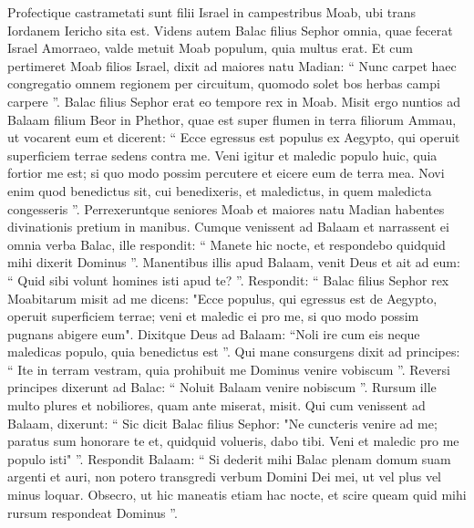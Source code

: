 \begin{biblechapter}
\begin{biblechapter}
\begin{biblechapter}
\begin{biblechapter}
\begin{biblechapter}
\begin{biblechapter}
\begin{biblechapter}
\begin{biblechapter}
\begin{biblechapter}
\begin{biblechapter}
\begin{biblechapter}
\begin{biblechapter}
\begin{biblechapter}
\begin{biblechapter}
\begin{biblechapter}
\begin{biblechapter}
\begin{biblechapter}
\begin{biblechapter}
\begin{biblechapter}
\begin{biblechapter}
\begin{biblechapter}
\begin{biblechapter}
\verse Profectique castrametati sunt filii Israel in campestribus Moab, ubi trans Iordanem Iericho sita est.
 \verse Videns autem Balac filius Sephor omnia, quae fecerat Israel Amorraeo, 
\verse valde metuit Moab populum, quia multus erat. Et cum pertimeret Moab filios Israel, 
\verse dixit ad maiores natu Madian: “ Nunc carpet haec congregatio omnem regionem per circuitum, quomodo solet bos herbas campi carpere ”.
 Balac filius Sephor erat eo tempore rex in Moab. 
\verse Misit ergo nuntios ad Balaam filium Beor in Phethor, quae est super flumen in terra filiorum Ammau, ut vocarent eum et dicerent: “ Ecce egressus est populus ex Aegypto, qui operuit superficiem terrae sedens contra me. 
\verse Veni igitur et maledic populo huic, quia fortior me est; si quo modo possim percutere et eicere eum de terra mea. Novi enim quod benedictus sit, cui benedixeris, et maledictus, in quem maledicta congesseris ”.
 \verse Perrexeruntque seniores Moab et maiores natu Madian habentes divinationis pretium in manibus. Cumque venissent ad Balaam et narrassent ei omnia verba Balac, 
\verse ille respondit: “ Manete hic nocte, et respondebo quidquid mihi dixerit Dominus ”. Manentibus illis apud Balaam, 
\verse venit Deus et ait ad eum: “ Quid sibi volunt homines isti apud te? ”. 
\verse Respondit: “ Balac filius Sephor rex Moabitarum misit ad me 
\verse dicens: "Ecce populus, qui egressus est de Aegypto, operuit superficiem terrae; veni et maledic ei pro me, si quo modo possim pugnans abigere eum". 
\verse Dixitque Deus ad Balaam: “Noli ire cum eis neque maledicas populo, quia benedictus est ”. 
\verse Qui mane consurgens dixit ad principes: “ Ite in terram vestram, quia prohibuit me Dominus venire vobiscum ”. 
\verse Reversi principes dixerunt ad Balac: “ Noluit Balaam venire nobiscum ”.
 \verse Rursum ille multo plures et nobiliores, quam ante miserat, misit. 
\verse Qui cum venissent ad Balaam, dixerunt: “ Sic dicit Balac filius Sephor: "Ne cuncteris venire ad me; 
\verse paratus sum honorare te et, quidquid volueris, dabo tibi. Veni et maledic pro me populo isti" ”. 
\verse Respondit Balaam: “ Si dederit mihi Balac plenam domum suam argenti et auri, non potero transgredi verbum Domini Dei mei, ut vel plus vel minus loquar. 
\verse Obsecro, ut hic maneatis etiam hac nocte, et scire queam quid mihi rursum respondeat Dominus ”. 

\end{biblechapter}
\end{biblechapter}
\end{biblechapter}
\end{biblechapter}
\end{biblechapter}
\end{biblechapter}
\end{biblechapter}
\end{biblechapter}
\end{biblechapter}
\end{biblechapter}
\end{biblechapter}
\end{biblechapter}
\end{biblechapter}
\end{biblechapter}
\end{biblechapter}
\end{biblechapter}
\end{biblechapter}
\end{biblechapter}
\end{biblechapter}
\end{biblechapter}
\end{biblechapter}
\end{biblechapter}
